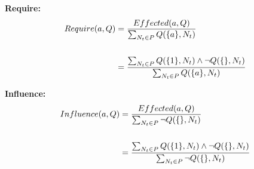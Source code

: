 \documentclass[10pt]{article}
\begin{document}
\textbf{Require:}
\begin{align}
\begin{split}
    Require(a,Q) &= \frac{Effected(a,Q)}{\sum_{N_t \in P} Q(\{a\},N_t){}} \\
\\
                 &= \frac{\sum_{N_t \in P} Q(\{1\},N_t) \land \lnot Q(\{\},N_t){}}{\sum_{N_t \in P} Q(\{a\},N_t){}}
\end{split}
\end{align}

\textbf{Influence:}
\begin{align}
\begin{split}
    Influence(a,Q) &= \frac{Effected(a,Q)}{\sum_{N_t \in P} \lnot Q(\{\},N_t){}} \\
\\
                   &= \frac{\sum_{N_t \in P} Q(\{1\},N_t) \land \lnot Q(\{\},N_t){}}{\sum_{N_t \in P} \lnot Q(\{\},N_t){}}
\end{split}
\end{align}
\\
\end{document}
